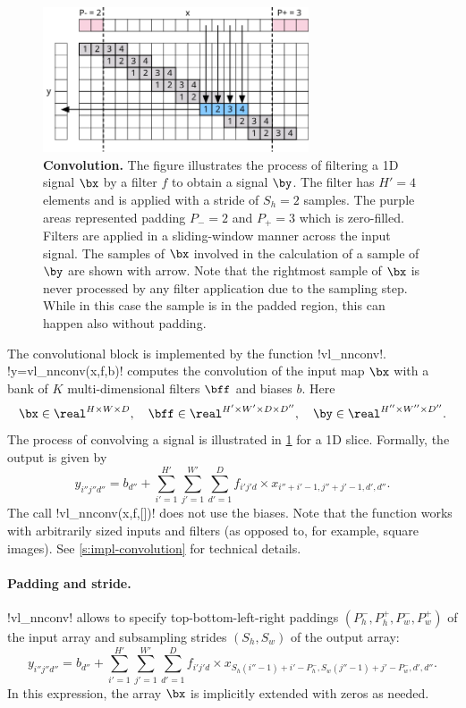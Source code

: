 \begin{figure}[t]
	\centering
	\includegraphics[width=0.7\textwidth]{figures/svg/conv}
	\caption{\textbf{Convolution.} The figure illustrates the process of filtering a 1D signal $\bx$ by a filter $f$ to obtain a signal $\by$. The filter has $H'=4$ elements and is applied with a stride of $S_h =2$ samples. The purple areas represented padding $P_-=2$ and $P_+=3$ which is zero-filled. Filters are applied in a sliding-window manner across the input signal. The samples of $\bx$ involved in the calculation of a sample of $\by$ are shown with arrow. Note that the rightmost sample of $\bx$  is never processed by any filter application due to the sampling step. While in this case the sample is in the padded region, this can happen also without padding.}\label{f:conv}
\end{figure}

The convolutional block is implemented by the function !vl_nnconv!. !y=vl_nnconv(x,f,b)! computes the convolution of the input map $\bx$ with a bank of $K$ multi-dimensional filters $\bff$ and biases $b$. Here
\[
 \bx\in\real^{H \times W \times D}, \quad
 \bff\in\real^{H' \times W' \times D \times D''}, \quad
 \by\in\real^{H'' \times W'' \times D''}.
\]
The process of convolving a signal is illustrated in \cref{f:conv} for a 1D slice. Formally, the output is given by
\[
y_{i''j''d''}
=
b_{d''}
+
\sum_{i'=1}^{H'}
\sum_{j'=1}^{W'}
\sum_{d'=1}^D
f_{i'j'd} \times x_{i''+i'-1,j''+j'-1,d',d''}.
\]
The call !vl_nnconv(x,f,[])! does not use the biases. Note that the function works with arbitrarily sized inputs and filters (as opposed to, for example, square images). See \cref{s:impl-convolution} for technical details.

\paragraph{Padding and stride.} !vl_nnconv! allows to specify  top-bottom-left-right paddings $(P_h^-,P_h^+,P_w^-,P_w^+)$ of the input array and subsampling strides $(S_h,S_w)$ of the output array:
\[
y_{i''j''d''}
=
b_{d''}
+
\sum_{i'=1}^{H'}
\sum_{j'=1}^{W'}
\sum_{d'=1}^D
f_{i'j'd} \times x_{S_h (i''-1)+i'-P_h^-, S_w(j''-1)+j' - P_w^-,d',d''}.
\]
In this expression, the array $\bx$ is implicitly extended with zeros as needed.

